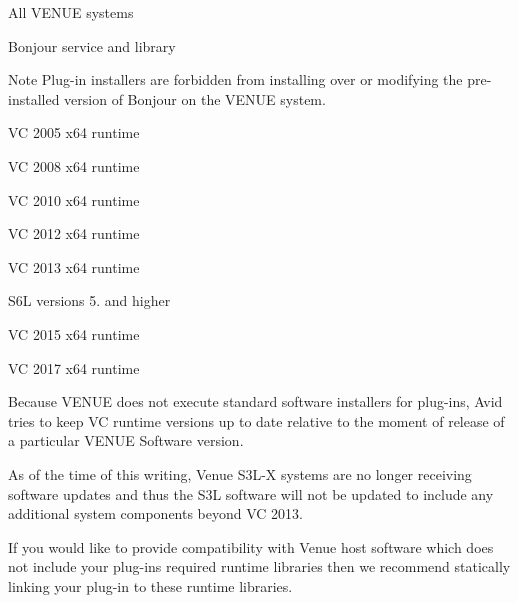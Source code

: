  
\begin{DoxyItemize}
\item All V\+E\+N\+UE systems 
\begin{DoxyItemize}
\item Bonjour service and library

\begin{DoxyNote}{Note}
Plug-\/in installers are forbidden from installing over or modifying the pre-\/installed version of Bonjour on the V\+E\+N\+UE system.  
\end{DoxyNote}

\item VC 2005 x64 runtime 
\item VC 2008 x64 runtime 
\item VC 2010 x64 runtime 
\item VC 2012 x64 runtime 
\item VC 2013 x64 runtime 
\end{DoxyItemize}
\item S6L versions 5. and higher 
\begin{DoxyItemize}
\item VC 2015 x64 runtime 
\item VC 2017 x64 runtime 
\end{DoxyItemize}
\end{DoxyItemize}

 Because V\+E\+N\+UE does not execute standard software installers for plug-\/ins, Avid tries to keep VC runtime versions up to date relative to the moment of release of a particular V\+E\+N\+UE Software version.

 As of the time of this writing, Venue S3\+L-\/X systems are no longer receiving software updates and thus the S3L software will not be updated to include any additional system components beyond VC 2013.

 If you would like to provide compatibility with Venue host software which does not include your plug-\/in\textquotesingle{}s required runtime libraries then we recommend statically linking your plug-\/in to these runtime libraries.

